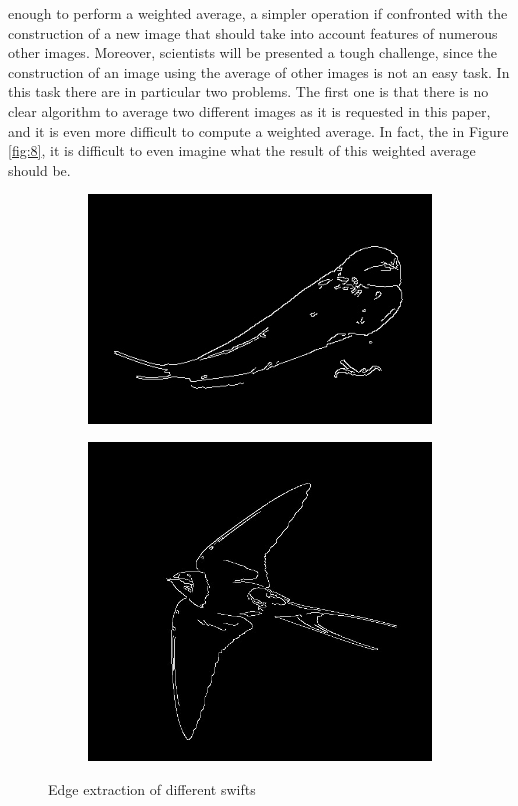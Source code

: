 \documentclass[conference]{IEEEtran}
\begin{document}
			enough to perform a weighted average, a simpler operation if confronted with the construction of a new image that should take into account features of numerous other images.
			Moreover, scientists will be presented a tough challenge, since the construction of an image using the average of other images is not an easy task. In this task there are in particular two problems. The first 
			one is that there is no clear algorithm to average two different images as it is requested in this paper, 
			and it is even more difficult to compute a weighted average. In fact, the in Figure \ref{fig:8}, it is difficult to even imagine what the result of this weighted average should be. 
			
			\begin{figure}[!t]
				\centering
				\begin{subfigure}[!t]{0.48\linewidth}
					\centerline{\includegraphics[width=0.9\linewidth]{imgs/swallow_edges.jpg}}
				\end{subfigure}
				\begin{subfigure}[!t]{0.48\linewidth}
					\centerline{\includegraphics[height=0.4\textheight]{imgs/swallow_2_edges.jpg}}
				\end{subfigure}
				\caption{Edge extraction of different swifts}
				\label{fig:9}
			\end{figure}
			
\end{document}
